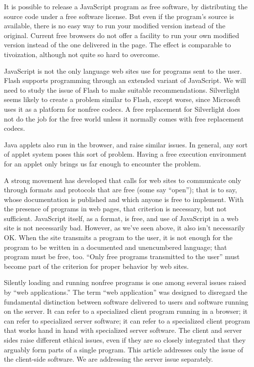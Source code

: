 It is possible to release a JavaScript program as free software, by
distributing the source code under a free software license.  But even
if the program's source is available, there is no easy way to run your
modified version instead of the original.  Current free browsers do
not offer a facility to run your own modified version instead of the
one delivered in the page.  The effect is comparable to 
tivoization, although not quite so hard to overcome.

JavaScript is not the only language web sites use for programs sent to
the user.  
Flash supports programming through an extended variant of
JavaScript.  We will need to study the issue of Flash to make suitable
recommendations.  Silverlight seems likely to create a problem similar
to Flash, except worse, since Microsoft uses it as a platform for
nonfree codecs.  A free replacement for 
Silverlight does not do the job for the free world unless it normally
comes with free replacement codecs.

Java applets also run in the browser, and raise similar issues.  In
general, any sort of applet system poses this sort of problem.  Having
a free execution environment for an applet only brings us far enough
to encounter the problem.

A strong movement has developed that calls for web sites to
communicate only through formats and protocols that are free (some say
``open''); that is to say, whose documentation is published and which
anyone is free to implement.  With the presence of programs in web
pages, that criterion is necessary, but not sufficient.  JavaScript
itself, as a format, is free, and use of JavaScript in a web site is
not necessarily bad.  However, as we've seen above, it also isn't
necessarily OK.  When the site transmits a program to the user, it is
not enough for the program to be written in a documented and
unencumbered language; that program must be free, too.  ``Only free
programs transmitted to the user'' must become part of the criterion
for proper behavior by web sites.

Silently loading and running nonfree programs is one among several
issues raised by 
``web applications.''  The term ``web application'' was designed to
disregard the fundamental distinction between software delivered to
users and software running on the server.  It can refer to a
specialized client program running in a browser; it can refer to
specialized server software; it can refer to a specialized client
program that works hand in hand with specialized server software.  The
client and server sides raise different ethical issues, even if they
are so closely integrated that they arguably form parts of a single
program.  This article addresses only the issue of the client-side
software.  We are addressing the server issue separately.

